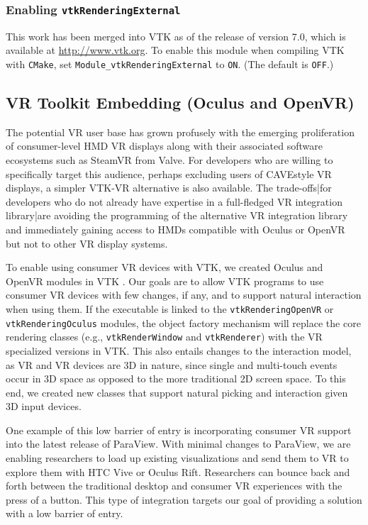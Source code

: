 \subsubsection{Enabling \texttt{vtkRenderingExternal}}

This work has been merged into VTK as of the release of version 7.0, which is available at
\url{http://www.vtk.org}.
To enable this module when compiling VTK with \texttt{CMake},
set \texttt{Module\_vtkRenderingExternal} to \texttt{ON}. (The default is \texttt{OFF}.)

\subsection{VR Toolkit Embedding (Oculus and OpenVR)}

The potential VR user base has grown profusely with the emerging
proliferation of consumer-level HMD VR displays along with their associated
software ecosystems such as SteamVR from Valve.
For developers who are willing to specifically target this audience, perhaps
excluding users of CAVE\texttrademark style VR displays, a simpler VTK-VR alternative is
also available.
The trade-offs|for developers who do not already have expertise in a
full-fledged VR integration library|are avoiding the programming of
the alternative VR integration library and immediately gaining access
to HMDs compatible with Oculus or OpenVR but not to other VR display systems.

To enable using consumer VR devices with VTK, we created Oculus and OpenVR modules in VTK .
Our goals are to allow VTK programs to use consumer VR devices with few changes, if any, and to support natural interaction when using them.
If the executable is linked to the \texttt{vtkRenderingOpenVR} or \texttt{vtkRenderingOculus} modules, the object factory
mechanism will replace the core rendering classes (e.g.,
\texttt{vtkRenderWindow} and \texttt{vtkRenderer}) with the VR specialized versions in VTK.  This also entails changes to the 
interaction model, as VR and VR devices are 3D in nature, since single and multi-touch events occur in 3D space as 
opposed to the more traditional 2D screen space. To this end, we created new classes that support natural picking and interaction given 3D 
input devices.

One example of this low barrier of entry is incorporating consumer VR support into the latest release of ParaView. With minimal changes to ParaView, we are enabling researchers to load up existing visualizations and send them to VR to explore them with HTC Vive or Oculus Rift. Researchers can bounce back and forth between the traditional desktop and consumer VR experiences with the press of a button. This type of integration targets our goal of providing a solution with a low barrier of entry.


